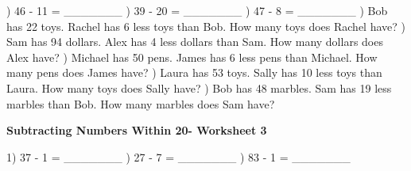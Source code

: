 \documentclass{article}%
\begin{document}
\newline%
) 46 {-} 11 = \_\_\_\_\_\_\_%
\newline%
\newline%
) 39 {-} 20 = \_\_\_\_\_\_\_%
\newline%
\newline%
) 47 {-} 8 = \_\_\_\_\_\_\_%
\newline%
\newline%
) Bob has 22 toys. Rachel has 6 less toys than Bob. How many toys does Rachel have?%
\newline%
\newline%
) Sam has 94 dollars. Alex has 4 less dollars than Sam. How many dollars does Alex have?%
\newline%
\newline%
) Michael has 50 pens. James has 6 less pens than Michael. How many pens does James have?%
\newline%
\newline%
) Laura has 53 toys. Sally has 10 less toys than Laura. How many toys does Sally have?%
\newline%
\newline%
) Bob has 48 marbles. Sam has 19 less marbles than Bob. How many marbles does Sam have?%
\newline%
\newline%
\newline%
\pagebreak%
\large%
\begin{center}%
\textbf{Subtracting Numbers Within 20- Worksheet 3}%
\newline%
\end{center} \normalsize%
1) 37 {-} 1 = \_\_\_\_\_\_\_%
\newline%
\newline%
) 27 {-} 7 = \_\_\_\_\_\_\_%
\newline%
\newline%
) 83 {-} 1 = \_\_\_\_\_\_\_%
\newline%
\newline%
\newline%
\end{document}
